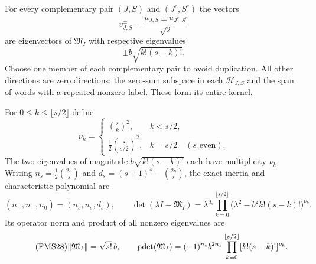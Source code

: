 \begin{theorem}\label{fms:fms:inertia}
For every complementary pair $(J,S)$ and $(J^c,S^c)$ the vectors
\begin{equation}\tag{FMS25}\label{fms:fms:eigenvectors}
 v_{J,S}^{\pm}=
        \frac{u_{J,S}\pm u_{J^c,S^c}}{\sqrt2}
\end{equation}
are eigenvectors of $\mathfrak M_I$ with respective eigenvalues
\[
 \pm b\sqrt{k!(s-k)!}.
\]
Choose one member of each complementary pair to avoid duplication.
All other directions are zero directions: the zero-sum subspace
in each $\mathcal H_{J,S}$ and the span of words with a repeated
nonzero label. These form its entire kernel.

For $0\le k\le\lfloor s/2\rfloor$ define
\begin{equation}\tag{FMS26}\label{fms:fms:multiplicities}
 \nu_k=
 \begin{cases}
 \binom{s}{k}^2,&k<s/2,\\[1mm]
 \frac12\binom{s}{s/2}^2,&k=s/2\quad(s\text{ even}).
 \end{cases}
\end{equation}
The two eigenvalues of magnitude $b\sqrt{k!(s-k)!}$ each
have multiplicity $\nu_k$. Writing
$n_s=\frac12\binom{2s}{s}$ and
$d_s=(s+1)^s-\binom{2s}{s}$, the exact inertia and
characteristic polynomial are
\begin{equation}\tag{FMS27}\label{fms:fms:inertiapoly}
 (n_+,n_-,n_0)=(n_s,n_s,d_s),\qquad
 \det(\lambda I-\mathfrak M_I)=
 \lambda^{d_s}\prod_{k=0}^{\lfloor s/2\rfloor}
       \bigl(\lambda^2-b^2 k!(s-k)!\bigr)^{\nu_k}.
\end{equation}
Its operator norm and product of all nonzero eigenvalues are
\begin{equation}\tag{FMS28}\label{fms:fms:normpdet}
 \|\mathfrak M_I\|=\sqrt{s!}\,b,\qquad
 \operatorname{pdet}(\mathfrak M_I)=
 (-1)^{n_s}b^{2n_s}
       \prod_{k=0}^{\lfloor s/2\rfloor}
                    [k!(s-k)!]^{\nu_k}.
\end{equation}
\end{theorem}
